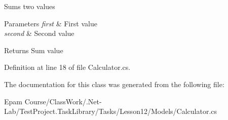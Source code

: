 Sums two values 


\begin{DoxyParams}{Parameters}
{\em first} & First value\\
\hline
{\em second} & Second value\\
\hline
\end{DoxyParams}
\begin{DoxyReturn}{Returns}
Sum value
\end{DoxyReturn}


Definition at line 18 of file Calculator.\+cs.



The documentation for this class was generated from the following file\+:\begin{DoxyCompactItemize}
\item 
Epam Course/\+Class\+Work/.\+Net-\/\+Lab/\+Test\+Project.\+Task\+Library/\+Tasks/\+Lesson12/\+Models/Calculator.\+cs\end{DoxyCompactItemize}
